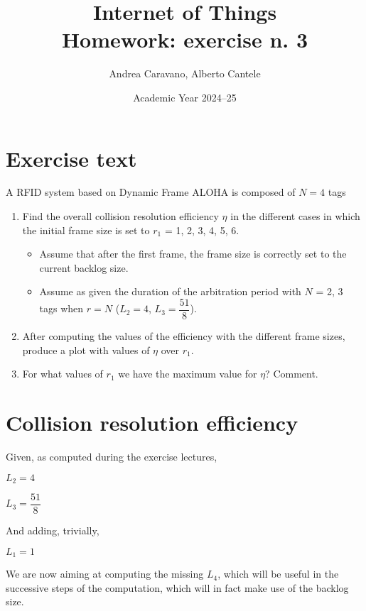 \documentclass[a4paper,11pt]{article} %
\title{\textbf{Internet of Things}\\Homework: exercise n. 3}
\author{Andrea Caravano, Alberto Cantele}
\date{Academic Year 2024--25}
\begin{document}
\maketitle


\section*{Exercise text}
A RFID system based on Dynamic Frame ALOHA is composed of $N=4$ tags

\begin{enumerate}
    \item Find the overall collision resolution efficiency $\eta$ in the different cases in which the initial frame size is set to $r_1$ = 1, 2, 3, 4, 5, 6.
        \begin{itemize}
            \item Assume that after the first frame, the frame size is correctly set to the current backlog size.
            \item Assume as given the duration of the arbitration period with $N$ = 2, 3 tags when $r = N$ ($L_2 = 4$, $L_3 = \dfrac{51}{8}$).
        \end{itemize}
    \item After computing the values of the efficiency with the different frame sizes, produce a plot with values of $\eta$ over $r_1$.
    \item For what values of $r_1$ we have the maximum value for $\eta$? Comment.
\end{enumerate}

\section{Collision resolution efficiency}

Given, as computed during the exercise lectures,

\smallskip

$L_2 = 4$

\medskip

$L_3 = \dfrac{51}{8}$

\medskip

And adding, trivially,

\smallskip

$L_1 = 1$

\medskip

We are now aiming at computing the missing $L_4$, which will be useful in the successive steps of the computation, which will in fact make use of the backlog size.
\end{document}

